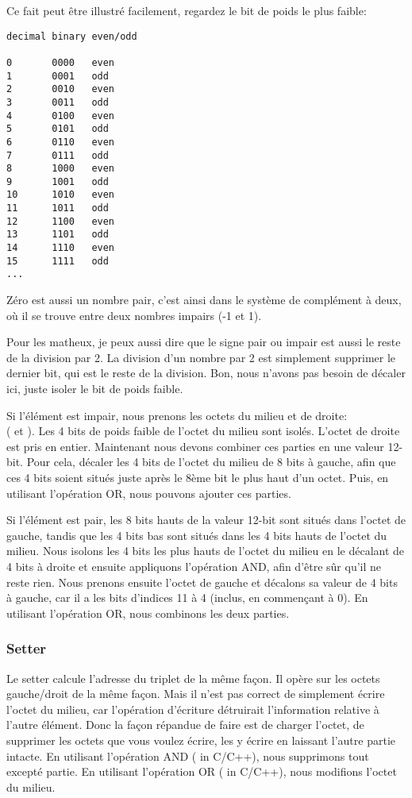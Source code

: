 Ce fait peut être illustré facilement, regardez le bit de poids le plus faible:

\begin{lstlisting}
decimal binary even/odd

0       0000   even
1       0001   odd
2       0010   even
3       0011   odd
4       0100   even
5       0101   odd
6       0110   even
7       0111   odd
8       1000   even
9       1001   odd
10      1010   even
11      1011   odd
12      1100   even
13      1101   odd
14      1110   even
15      1111   odd
...
\end{lstlisting}

Zéro est aussi un nombre pair, c'est ainsi dans le système de complément à deux,
où il se trouve entre deux nombres impairs (-1 et 1).

Pour les matheux, je peux aussi dire que le signe pair ou impair est aussi le
reste de la division par 2.
La division d'un nombre par 2 est simplement supprimer le dernier bit, qui est le
reste de la division.
Bon, nous n'avons pas besoin de décaler ici, juste isoler le bit de poids faible.

Si l'élément est impair, nous prenons les octets du milieu et de droite:\\ (
et ).
Les 4 bits de poids faible de l'octet du milieu sont isolés.
L'octet de droite est pris en entier.
Maintenant nous devons combiner ces parties en une valeur 12-bit.
Pour cela, décaler les 4 bits de l'octet du milieu de 8 bits à gauche, afin que ces
4 bits soient situés juste après le 8ème bit le plus haut d'un octet.
Puis, en utilisant l'opération OR, nous pouvons ajouter ces parties.

Si l'élément est pair, les 8 bits hauts de la valeur 12-bit sont situés dans l'octet
de gauche, tandis que les 4 bits bas sont situés dans les 4 bits hauts de l'octet
du milieu.
Nous isolons les 4 bits les plus hauts de l'octet du milieu en le décalant de 4 bits
à droite et ensuite appliquons l'opération AND, afin d'être sûr qu'il ne reste rien.
Nous prenons ensuite l'octet de gauche et décalons sa valeur de 4 bits à gauche,
car il a les bits d'indices 11 à 4 (inclus, en commençant à 0).
En utilisant l'opération OR, nous combinons les deux parties.

\subsubsection{Setter}

Le setter calcule l'adresse du triplet de la même façon.
Il opère sur les octets gauche/droit de la même façon.
Mais il n'est pas correct de simplement écrire l'octet du milieu, car l'opération
d'écriture détruirait l'information relative à l'autre élément.
Donc la façon répandue de faire est de charger l'octet, de supprimer les octets que
vous voulez écrire, les y écrire en laissant l'autre partie intacte.
En utilisant l'opération AND (\TT{\&} in C/C++), nous supprimons tout excepté  partie.
En utilisant l'opération OR (\TT{|} in C/C++), nous modifions l'octet du milieu.

